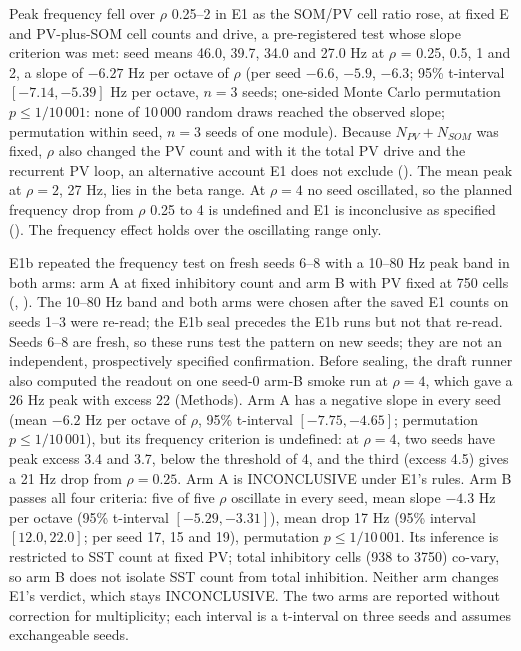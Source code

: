 Peak frequency fell over $\rho$ 0.25--2 in E1 as the SOM/PV cell ratio rose, at fixed E and PV-plus-SOM cell counts and drive, a pre-registered test whose slope criterion was met: seed
means 46.0, 39.7, 34.0 and 27.0 Hz at $\rho$ = 0.25, 0.5, 1 and 2, a slope of $-6.27$ Hz per octave of $\rho$ (per
seed $-6.6$, $-5.9$, $-6.3$; 95\% t-interval $[-7.14, -5.39]$ Hz per octave, $n = 3$ seeds; one-sided Monte Carlo permutation $p \leq 1/10\,001$: none of 10\,000 random draws
reached the observed slope; permutation within seed, $n = 3$ seeds of one module). Because $N_{PV} + N_{SOM}$
was fixed, $\rho$ also changed the PV count and with it the total PV drive and the recurrent PV loop, an
alternative account E1 does not exclude (). The mean peak at $\rho = 2$, 27 Hz, lies in the beta range. At $\rho = 4$ no seed oscillated, so the planned frequency drop from $\rho$ 0.25 to 4
is undefined and E1 is inconclusive as specified (). The frequency effect holds over the oscillating range
only.

E1b repeated the frequency test on fresh seeds 6--8 with a 10--80 Hz peak band in both arms: arm A at fixed inhibitory count and arm B with PV fixed at 750 cells (, ). The 10--80 Hz band and both arms were chosen after the saved E1 counts on seeds 1--3 were re-read; the E1b seal precedes the E1b runs but not that re-read. Seeds 6--8 are fresh, so these runs test the pattern on new seeds; they are not an independent, prospectively specified confirmation. Before sealing, the draft runner also computed the readout on one seed-0 arm-B smoke run at $\rho = 4$, which gave a 26 Hz peak with excess 22 (Methods). Arm A has a negative slope in every seed (mean $-6.2$ Hz per octave of $\rho$, 95\% t-interval $[-7.75, -4.65]$;
permutation $p \leq 1/10\,001$), but its frequency criterion is undefined: at $\rho = 4$, two seeds have peak excess
3.4 and 3.7, below the threshold of 4, and the third (excess 4.5) gives a 21 Hz drop from $\rho = 0.25$. Arm A is
INCONCLUSIVE under E1's rules. Arm B passes all four criteria: five of five $\rho$ oscillate in every seed, mean slope
$-4.3$ Hz per octave (95\% t-interval $[-5.29, -3.31]$), mean drop 17 Hz (95\% interval $[12.0, 22.0]$; per seed 17, 15 and 19), permutation $p \leq 1/10\,001$. Its inference is
restricted to SST count at fixed PV; total inhibitory cells (938 to 3750) co-vary, so arm B does not isolate SST count
from total inhibition. Neither arm changes E1's verdict, which stays INCONCLUSIVE. The two arms are reported without correction for multiplicity; each interval is a t-interval on three seeds and assumes exchangeable seeds.

